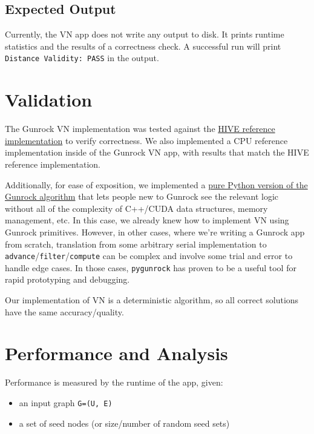 \documentclass[10pt,oneside]{memoir}
\providecommand{\tightlist}{%
  \setlength{\itemsep}{0pt}\setlength{\parskip}{0pt}}
\begin{document}
\hypertarget{expected-output-5}{%
\subsection{Expected Output}\label{expected-output-5}}

Currently, the VN app does not write any output to disk. It prints
runtime statistics and the results of a correctness check. A successful
run will print \texttt{Distance\ Validity:\ PASS} in the output.

\hypertarget{validation-2}{%
\section{Validation}\label{validation-2}}

The Gunrock VN implementation was tested against the
\href{https://gitlab.hiveprogram.com/ggillary/vertex_nomination_Enron/blob/master/snap_vertex_nomination.py}{HIVE
reference implementation} to verify correctness. We also implemented a
CPU reference implementation inside of the Gunrock VN app, with results
that match the HIVE reference implementation.

Additionally, for ease of exposition, we implemented a
\href{https://github.com/gunrock/pygunrock/blob/master/apps/vn.py}{pure
Python version of the Gunrock algorithm} that lets people new to Gunrock
see the relevant logic without all of the complexity of C++/CUDA data
structures, memory management, etc. In this case, we already knew how to
implement VN using Gunrock primitives. However, in other cases, where
we're writing a Gunrock app from scratch, translation from some
arbitrary serial implementation to
\texttt{advance}/\texttt{filter}/\texttt{compute} can be complex and
involve some trial and error to handle edge cases. In those cases,
\texttt{pygunrock} has proven to be a useful tool for rapid prototyping
and debugging.

Our implementation of VN is a deterministic algorithm, so all correct
solutions have the same accuracy/quality.

\hypertarget{performance-and-analysis-9}{%
\section{Performance and Analysis}\label{performance-and-analysis-9}}

Performance is measured by the runtime of the app, given:

\begin{itemize}
\tightlist
\item
  an input graph \texttt{G=(U,\ E)}
\item
  a set of seed nodes (or size/number of random seed sets)
\end{itemize}
\end{document}
